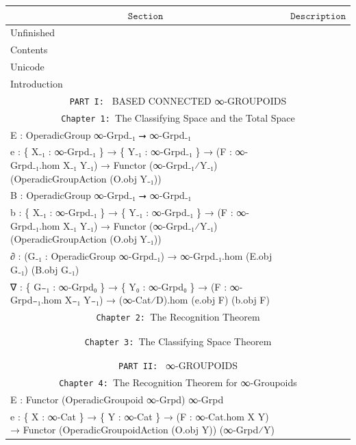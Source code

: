 \documentclass{book}
\theoremstyle{definition}
\begin{document}
{
\footnotesize
\begin{longtable}{|| l || l ||} 
\hline
\multicolumn{1}{||c||}{$\texttt{Section}$} & \multicolumn{1}{|c||}{$\texttt{Description}$} \\
\hline
\hline
Unfinished & \\
\hline
Contents & \\
\hline
Unicode & \\
\hline
Introduction & \\
\hline \hline
\multicolumn{2}{||c||}{\texttt{PART I: } BASED CONNECTED ∞-GROUPOIDS} \\
\hline \hline
\multicolumn{2}{||c||}{\texttt{Chapter 1: }The Classifying Space and the Total Space} \\
\hline \hline
E : OperadicGroup ∞-Grpd₋₁ ⭢ ∞-Grpd₋₁ &  \\
\hline
e : \{ X₋₁ : ∞-Grpd₋₁ \} → \{ Y₋₁ : ∞-Grpd₋₁ \} → (F : ∞-Grpd₋₁.hom X₋₁ Y₋₁) → Functor (∞-Grpd₋₁⁄Y₋₁) (OperadicGroupAction (O.obj Y₋₁))  & \\
\hline
B : OperadicGroup ∞-Grpd₋₁ ⭢ ∞-Grpd₋₁ &  \\
\hline
b : \{ X₋₁ : ∞-Grpd₋₁ \} → \{ Y₋₁ : ∞-Grpd₋₁ \} → (F : ∞-Grpd₋₁.hom X₋₁ Y₋₁) → Functor (∞-Grpd₋₁⁄Y₋₁) (OperadicGroupAction (O.obj Y₋₁)) & \\
\hline
∂ : (G₋₁ : OperadicGroup ∞-Grpd₋₁) → ∞-Grpd₋₁.hom (E.obj G₋₁) (B.obj G₋₁) &  \\
\hline
∇ : \{ G₋₁ : ∞-Grpd₀ \} → \{ Y₀ : ∞-Grpd₀ \} → (F : ∞-Grpd₋₁.hom X₋₁ Y₋₁) → (∞-Cat⁄D).hom (e.obj F) (b.obj F) & \\
\hline
\multicolumn{2}{||c||}{\texttt{Chapter 2: }The Recognition Theorem} \\
\hline \hline
 & \\
\hline
 & \\
\multicolumn{2}{||c||}{\texttt{Chapter 3: }The Classifying Space Theorem} \\
\hline \hline
 & \\
\hline
 & \\
\hline \hline
\multicolumn{2}{||c||}{\texttt{PART II: } ∞-GROUPOIDS} \\
\hline \hline
\multicolumn{2}{||c||}{\texttt{Chapter 4: }The Recognition Theorem for ∞-Groupoids} \\
\hline \hline
E⃡ : Functor (OperadicGroupoid ∞-Grpd) ∞-Grpd & \\
\hline
e⃡ : \{ X : ∞-Cat \} → \{ Y : ∞-Cat \} → (F : ∞-Cat.hom X Y) → Functor (OperadicGroupoidAction (O⃡.obj Y)) (∞-Grpd⁄Y) & \\

\end{longtable}}
\end{document}

